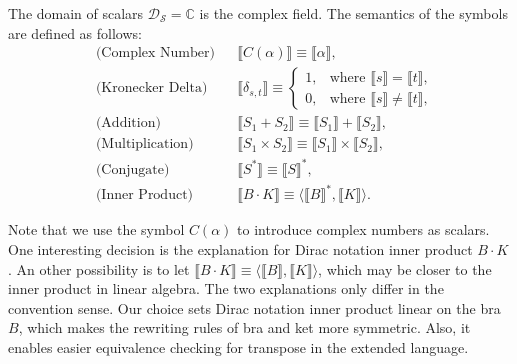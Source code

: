 \documentclass[manuscript, review, timestamp]{acmart}
\newcommand*{\sem}[1]{\llbracket #1 \rrbracket}
\begin{document}
\begin{definition}
  The domain of scalars $\mathcal{D}_\mathcal{S} = \mathbb{C}$ is the complex field.
  The semantics of the symbols are defined as follows:
  \begin{align*}
    & \text{(Complex Number)} &&
    \sem{C(\alpha)} \equiv \sem{\alpha}, \\
    & \text{(Kronecker Delta)} &&
    \sem{\delta_{s, t}} \equiv \left\{
      \begin{array}{ll}
        1, & \text{where } \sem{s} = \sem{t}, \\
        0, & \text{where } \sem{s} \neq \sem{t}, 
      \end{array}
    \right. \\
    & \text{(Addition)} &&
    \sem{S_1 + S_2} \equiv \sem{S_1} + \sem{S_2}, \\
    & \text{(Multiplication)} &&
    \sem{S_1 \times S_2} \equiv \sem{S_1} \times \sem{S_2}, \\
    & \text{(Conjugate)} &&
    \sem{S^*} \equiv \sem{S}^*, \\
    & \text{(Inner Product)} &&
    \sem{B \cdot K} \equiv \langle \sem{B}^*, \sem{K} \rangle.
  \end{align*}
\end{definition}

Note that we use the symbol $C(\alpha)$ to introduce complex numbers as scalars.
One interesting decision is the explanation for Dirac notation inner product $B \cdot K$. An other possibility is to let $\sem{B \cdot K} \equiv \langle \sem{B}, \sem{K} \rangle$, which may be closer to the inner product in linear algebra. The two explanations only differ in the convention sense. Our choice sets Dirac notation inner product linear on the bra $B$, which makes the rewriting rules of bra and ket more symmetric. Also, it enables easier equivalence checking for transpose in the extended language.
\end{document}

